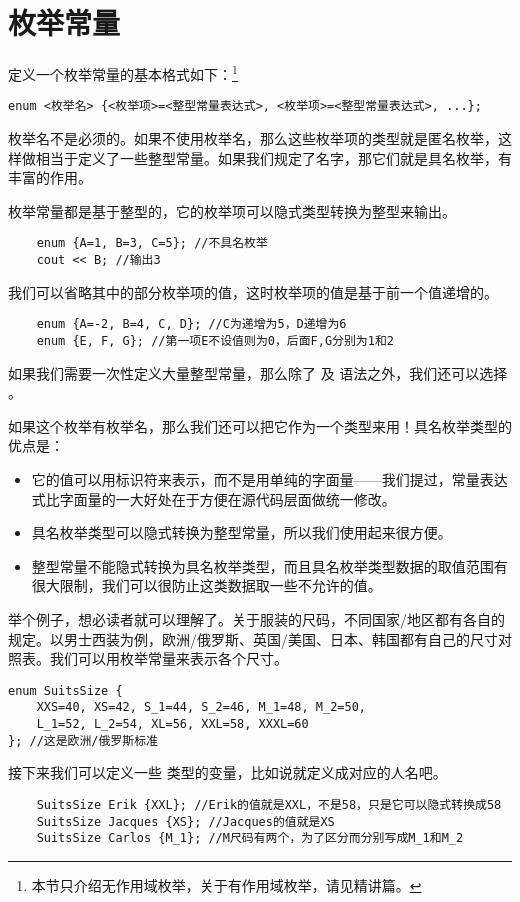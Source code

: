 \section{枚举常量}
定义一个枚举常量的基本格式如下：\footnote{本节只介绍无作用域枚举，关于有作用域枚举，请见精讲篇。}
\begin{lstlisting}
enum <枚举名> {<枚举项>=<整型常量表达式>, <枚举项>=<整型常量表达式>, ...};
\end{lstlisting}\par
枚举名不是必须的。如果不使用枚举名，那么这些枚举项的类型就是匿名枚举，这样做相当于定义了一些整型常量。如果我们规定了名字，那它们就是具名枚举，有丰富的作用。\par
枚举常量都是基于整型的，它的枚举项可以隐式类型转换为整型来输出。
\begin{lstlisting}
    enum {A=1, B=3, C=5}; //不具名枚举
    cout << B; //输出3
\end{lstlisting}
我们可以省略其中的部分枚举项的值，这时枚举项的值是基于前一个值递增的。
\begin{lstlisting}
    enum {A=-2, B=4, C, D}; //C为递增为5，D递增为6
    enum {E, F, G}; //第一项E不设值则为0，后面F,G分别为1和2
\end{lstlisting}
如果我们需要一次性定义大量整型常量，那么除了 \lstinline@const@ 及 \lstinline@constexpr@ 语法之外，我们还可以选择 \lstinline@enum@。\par
如果这个枚举有枚举名，那么我们还可以把它作为一个类型来用！具名枚举类型的优点是：
\begin{itemize}
    \item 它的值可以用标识符来表示，而不是用单纯的字面量——我们提过，常量表达式比字面量的一大好处在于方便在源代码层面做统一修改。
    \item 具名枚举类型可以隐式转换为整型常量，所以我们使用起来很方便。
    \item 整型常量不能隐式转换为具名枚举类型，而且具名枚举类型数据的取值范围有很大限制，我们可以很防止这类数据取一些不允许的值。
\end{itemize}
举个例子，想必读者就可以理解了。关于服装的尺码，不同国家/地区都有各自的规定。以男士西装为例，欧洲/俄罗斯、英国/美国、日本、韩国都有自己的尺寸对照表。我们可以用枚举常量来表示各个尺寸。
\begin{lstlisting}
enum SuitsSize {
    XXS=40, XS=42, S_1=44, S_2=46, M_1=48, M_2=50,
    L_1=52, L_2=54, XL=56, XXL=58, XXXL=60
}; //这是欧洲/俄罗斯标准
\end{lstlisting}
接下来我们可以定义一些 \lstinline@SuitsSize@ 类型的变量，比如说就定义成对应的人名吧。
\begin{lstlisting}
    SuitsSize Erik {XXL}; //Erik的值就是XXL，不是58，只是它可以隐式转换成58
    SuitsSize Jacques {XS}; //Jacques的值就是XS
    SuitsSize Carlos {M_1}; //M尺码有两个，为了区分而分别写成M_1和M_2
\end{lstlisting}\par
